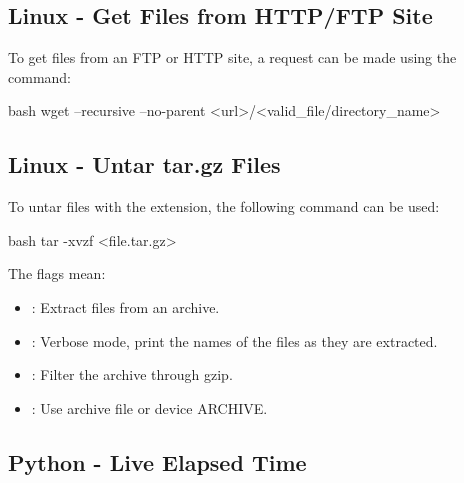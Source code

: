 \newpage
\subsection{Linux - Get Files from HTTP/FTP Site}

To get files from an FTP or HTTP site, a request can be made using the  command:
\begin{mintedbox}{bash}
wget --recursive --no-parent <url>/<valid_file/directory_name>
\end{mintedbox}


\subsection{Linux - Untar tar.gz Files}

To untar files with the  extension, the following command can be used:
\begin{mintedbox}{bash}
tar -xvzf <file.tar.gz>
\end{mintedbox}
The flags mean:
\begin{itemize}
    \item {}: Extract files from an archive.
    \item {}: Verbose mode, print the names of the files as they are extracted.
    \item {}: Filter the archive through gzip.
    \item {}: Use archive file or device ARCHIVE.
\end{itemize}


\newpage
\subsection{Python - Live Elapsed Time}

